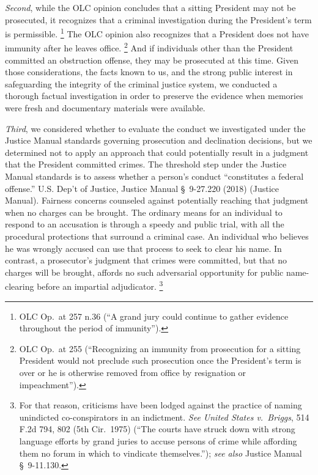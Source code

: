 \textit{Second}, while the OLC opinion concludes that a sitting President may not be prosecuted, it recognizes that a criminal investigation during the President's term is permissible.%
\footnote{OLC Op.\ at 257 n.36 (``A grand jury could continue to gather evidence throughout the period of immunity'').}
The OLC opinion also recognizes that a President does not have immunity after he leaves office.%
\footnote{OLC Op.\ at 255 (``Recognizing an immunity from prosecution for a sitting President would not preclude such prosecution once the President's term is over or he is otherwise removed from office by resignation or impeachment'').}
And if individuals other than the President committed an obstruction offense, they may be prosecuted at this time.
Given those considerations, the facts known to us, and the strong public interest in safeguarding the integrity of the criminal justice system, we conducted a thorough factual investigation in order to preserve the evidence when memories were fresh and documentary materials were available.

\textit{Third}, we considered whether to evaluate the conduct we investigated under the Justice Manual standards governing prosecution and declination decisions, but we determined not to apply an approach that could potentially result in a judgment that the President committed crimes.
The threshold step under the Justice Manual standards is to assess whether a person's conduct
``constitutes a federal offense.''
U.S. Dep't of Justice, Justice Manual \S~9-27.220 (2018) (Justice Manual).
Fairness concerns counseled against potentially reaching that judgment when no charges can be brought.
The ordinary means for an individual to respond to an accusation is through a speedy and public trial, with all the procedural protections that surround a criminal case.
An individual who believes he was wrongly accused can use that process to seek to clear his name.
In contrast, a prosecutor's judgment that crimes were committed, but that no charges will be brought, affords no such adversarial opportunity for public name-clearing before an impartial adjudicator.%
\footnote{For that reason, criticisms have been lodged against the practice of naming unindicted co-conspirators in an indictment.
\textit{See United States v.\ Briggs}, 514 F.2d 794, 802 (5th Cir.~1975) (``The courts have struck down with strong language efforts by grand juries to accuse persons of crime while affording them no forum in which to vindicate themselves.'');
\textit{see also} Justice Manual \S~9-11.130.}

